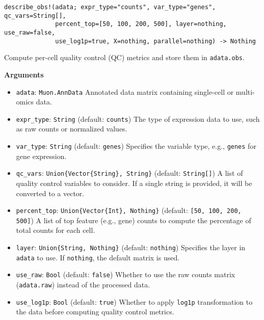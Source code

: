 \documentclass[oneside]{memoir}
\begin{document}
\begin{adjustwidth}{2em}{0pt}


\begin{verbatim}
describe_obs!(adata; expr_type="counts", var_type="genes", qc_vars=String[], 
              percent_top=[50, 100, 200, 500], layer=nothing, use_raw=false, 
              use_log1p=true, X=nothing, parallel=nothing) -> Nothing
\end{verbatim}

Compute per-cell quality control (QC) metrics and store them in \texttt{adata.obs}.

\textbf{Arguments}

\begin{itemize}
\item \texttt{adata}: \texttt{Muon.AnnData}   Annotated data matrix containing single-cell or multi-omics data.


\item \texttt{expr\_type}: \texttt{String} (default: \texttt{{\textquotedbl}counts{\textquotedbl}})   The type of expression data to use, such as raw counts or normalized values.


\item \texttt{var\_type}: \texttt{String} (default: \texttt{{\textquotedbl}genes{\textquotedbl}})   Specifies the variable type, e.g., \texttt{{\textquotedbl}genes{\textquotedbl}} for gene expression.


\item \texttt{qc\_vars}: \texttt{Union\{Vector\{String\}, String\}} (default: \texttt{String[]})   A list of quality control variables to consider. If a single string is provided, it will be converted to a vector.


\item \texttt{percent\_top}: \texttt{Union\{Vector\{Int\}, Nothing\}} (default: \texttt{[50, 100, 200, 500]})   A list of top feature (e.g., gene) counts to compute the percentage of total counts for each cell.


\item \texttt{layer}: \texttt{Union\{String, Nothing\}} (default: \texttt{nothing})   Specifies the layer in \texttt{adata} to use. If \texttt{nothing}, the default matrix is used.


\item \texttt{use\_raw}: \texttt{Bool} (default: \texttt{false})   Whether to use the raw counts matrix (\texttt{adata.raw}) instead of the processed data.


\item \texttt{use\_log1p}: \texttt{Bool} (default: \texttt{true})   Whether to apply \texttt{log1p} transformation to the data before computing quality control metrics.



\end{itemize}
\end{adjustwidth}
\end{document}
